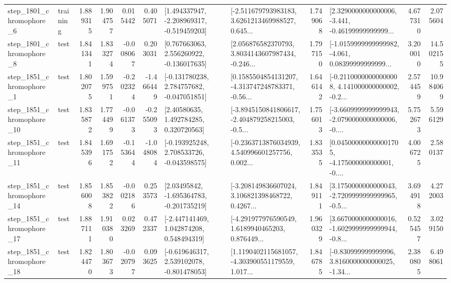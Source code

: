 \begin{tabular}{llrrrrllrlrr}
  step\_1801\_chromophore\_6 &  training &      1.889315 &    1.904757 &      0.015442 &  0.405071 &   [1.494337947, -2.208969317, -0.519459203] &  [-2.511679793983183, 3.6261213469988527, 0.645... &       1.749068 &  [2.3290000000000006, -3.441, -0.46199999999999... &            4.677310 &          2.075604 \\
  step\_1801\_chromophore\_8 &      test &      1.841341 &    1.833274 &     -0.008067 &  0.203031 &    [0.767663063, 2.556260922, -0.136017635] &  [2.056876582370793, 3.8034143607987434, -0.246... &       1.797150 &  [-1.0159999999999982, -4.061, 0.08399999999999... &            3.200010 &         14.502155 \\
  step\_1851\_chromophore\_1 &      test &      1.802075 &    1.599751 &     -0.202324 & -1.466449 &   [-0.131780238, 2.784757682, -0.047051851] &  [0.1585504854131207, -4.313747248783371, -0.56... &       1.646142 &  [-0.21100000000000008, 4.141000000000002, -0.2... &            2.574459 &         10.984069 \\
 step\_1851\_chromophore\_10 &      test &      1.835872 &    1.774499 &     -0.061373 & -0.255093 &      [2.40580635, 1.492784285, 0.320720563] &  [-3.8945150841806617, -2.404879258215003, -0.5... &       1.756013 &  [-3.6609999999999943, -2.0790000000000006, -0.... &            5.752673 &          5.596129 \\
 step\_1851\_chromophore\_11 &      test &      1.845396 &    1.691752 &     -0.153644 & -1.048084 &   [-0.193925248, 2.708533726, -0.043598575] &  [-0.2363713876034939, 4.540996601257756, 0.002... &       1.833535 &  [0.045000000000001705, -4.175000000000001, -0.... &            4.006725 &          2.580137 \\
 step\_1851\_chromophore\_14 &      test &      1.856008 &    1.853822 &     -0.002186 &  0.253573 &    [2.03495842, -1.695364783, -0.201735219] &  [-3.208149836607024, 3.106821398468722, 0.4267... &       1.849111 &  [3.1750000000000043, -2.7209999999999965, -0.5... &            3.694918 &          4.272003 \\
 step\_1851\_chromophore\_17 &      test &      1.887111 &    1.910380 &      0.023269 &  0.472337 &    [-2.447141469, 1.042874208, 0.548494319] &  [-4.291977976590549, 1.6189940465203, 0.876449... &       1.960329 &  [3.6670000000000016, -1.6029999999999944, -0.8... &            0.525457 &          3.029150 \\
 step\_1851\_chromophore\_18 &      test &      1.824470 &    1.803673 &     -0.020797 &  0.093625 &   [-0.619646317, 2.539102078, -0.801478053] &  [1.1190402115681057, -4.303900551179559, 1.017... &       1.846785 &  [-0.830999999999996, 3.8160000000000025, -1.34... &            2.380805 &          6.498061 \\

\end{tabular}
